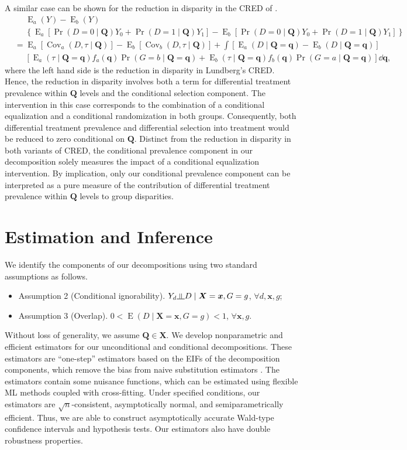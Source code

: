 \documentclass[12pt,a4paper]{article}
\newcommand{\indep}{\rotatebox[origin=c]{90}{$\models$}}  %
\newcommand{\Cov}{\operatorname{Cov}}
\newcommand{\E}{\operatorname{E}}
\def\X{{\boldsymbol X}}
\def\x{{\boldsymbol x}}
\def\Q{{\boldsymbol Q}}
\def\q{{\boldsymbol q}}
\DeclareMathOperator{\Pro}{Pr}
\begin{document}
A similar case can be shown for the reduction in disparity in the CRED of \citet{lundberg_gap-closing_2022}.
\begin{align}
&\phantom{{}={}} \E_a(Y)-\E_b(Y) \nonumber \\ 
&\phantom{{}={}} \left\lbrace \E_a[\Pro(D=0 \mid \Q) Y_0 + \Pro(D=1 \mid \Q) Y_1] - \E_b[\Pro(D=0 \mid \Q) Y_0 + \Pro(D=1 \mid \Q) Y_1] \right\rbrace \nonumber \\
&= \E_a[\Cov_a(D,\tau \mid \Q)] - \E_b[\Cov_b(D,\tau \mid \Q)] + \int [\E_a(D \mid \Q=\q) - \E_b(D \mid \Q=\q)] \nonumber \\
&\phantom{{}={}} [\E_a(\tau \mid \Q=\q)f_a(\q)\Pro(G=b \mid \Q=\q) + \E_b(\tau \mid \Q=\q)f_b(\q)\Pro(G=a \mid \Q=\q)] \dd \q,
\end{align}
where the left hand side is the reduction in disparity in Lundberg's CRED. Hence, the reduction in disparity involves both a term for differential treatment prevalence within $\Q$ levels and the conditional selection component. The intervention in this case corresponds to the combination of a conditional equalization and a conditional randomization in both groups. Consequently, both differential treatment prevalence and differential selection into treatment would be reduced to zero conditional on $\Q$. Distinct from the reduction in disparity in both variants of CRED, the conditional prevalence component in our decomposition solely measures the impact of a conditional equalization intervention. By implication, only our conditional prevalence component can be interpreted as a pure measure of the contribution of differential treatment prevalence within $\Q$ levels to  group disparities. 


\section{Estimation and Inference}
We identify the components of our decompositions using two standard assumptions as follows.
\begin{itemize}
    \item[] Assumption 2 (Conditional ignorability). $Y_d \indep D \mid \X=\x, G=g$, $\forall d, \x, g$;
    \item[] Assumption 3 (Overlap). $0 < \E(D \mid \X=\x, G=g) <1$, $\forall \x, g$.
\end{itemize}
Without loss of generality, we assume $\Q \in \X$. 
We develop nonparametric and efficient estimators for our unconditional and conditional decompositions.
These estimators are ``one-step'' estimators based on the EIFs of the decomposition components, which remove the bias from naive substitution estimators \citep{bickel_efficient_1998, van_der_vaart_asymptotic_2000,hines_demystifying_2022}. The estimators contain some nuisance functions, which can be estimated using flexible ML methods coupled with cross-fitting. Under specified conditions, our estimators are $\sqrt{n}$-consistent, asymptotically normal, and semiparametrically efficient. Thus, we are able to construct asymptotically accurate Wald-type confidence intervals and hypothesis tests. Our estimators also have double robustness properties. 
\end{document}
